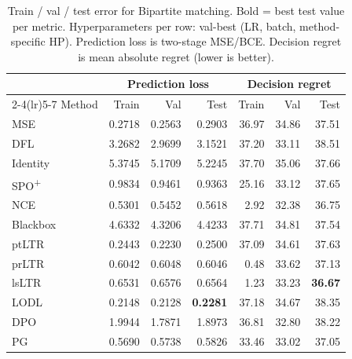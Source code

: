 \begin{table}[t]
\centering
\caption[Train/val/test error for Bipartite matching.]{Train / val / test error for Bipartite matching. Bold = best test value per metric. Hyperparameters per row: val-best (LR, batch, method-specific HP). Prediction loss is two-stage MSE/BCE. Decision regret is mean absolute regret (lower is better).}
\label{tab:err-bipartitematching}
\setlength{\tabcolsep}{4pt}
\renewcommand{\arraystretch}{1.05}
\begin{tabular}{@{}lrrrrrr@{}}
\toprule
& \multicolumn{3}{c}{Prediction loss} & \multicolumn{3}{c}{Decision regret} \\
\cmidrule(lr){2-4}\cmidrule(lr){5-7}
Method & Train & Val & Test & Train & Val & Test \\
\midrule
MSE & 0.2718 & 0.2563 & 0.2903 & 36.97 & 34.86 & 37.51 \\
DFL & 3.2682 & 2.9699 & 3.1521 & 37.20 & 33.11 & 38.51 \\
Identity & 5.3745 & 5.1709 & 5.2245 & 37.70 & 35.06 & 37.66 \\
SPO\textsuperscript{+} & 0.9834 & 0.9461 & 0.9363 & 25.16 & 33.12 & 37.65 \\
NCE & 0.5301 & 0.5452 & 0.5618 & 2.92 & 32.38 & 36.75 \\
Blackbox & 4.6332 & 4.3206 & 4.4233 & 37.71 & 34.81 & 37.54 \\
ptLTR & 0.2443 & 0.2230 & 0.2500 & 37.09 & 34.61 & 37.63 \\
prLTR & 0.6042 & 0.6048 & 0.6046 & 0.48 & 33.62 & 37.13 \\
lsLTR & 0.6531 & 0.6576 & 0.6564 & 1.23 & 33.23 & \textbf{36.67} \\
LODL & 0.2148 & 0.2128 & \textbf{0.2281} & 37.18 & 34.67 & 38.35 \\
DPO & 1.9944 & 1.7871 & 1.8973 & 36.81 & 32.80 & 38.22 \\
PG & 0.5690 & 0.5738 & 0.5826 & 33.46 & 33.02 & 37.05 \\
\bottomrule
\end{tabular}
\end{table}

